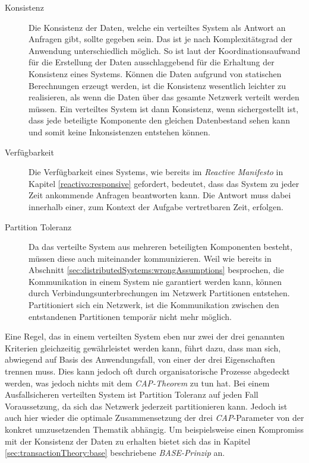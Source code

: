 \begin{description}
\item[Konsistenz]
Die Konsistenz der Daten, welche ein verteiltes System als Antwort an Anfragen gibt, sollte gegeben sein. Das ist je nach Komplexitätsgrad der Anwendung unterschiedlich möglich. So ist laut \cite{gilbertPerspectiveCAPTheorem2012} der Koordinationsaufwand für die Erstellung der Daten ausschlaggebend für die Erhaltung der Konsistenz eines Systems. Können die Daten aufgrund von statischen Berechnungen erzeugt werden, ist die Konsistenz wesentlich leichter zu realisieren, als wenn die Daten über das gesamte Netzwerk verteilt werden müssen. Ein verteiltes System ist dann Konsistenz, wenn sichergestellt ist, dass jede beteiligte Komponente den gleichen Datenbestand sehen kann und somit keine Inkonsistenzen entstehen können.   

\item[Verfügbarkeit]
Die Verfügbarkeit eines Systems, wie bereits im {\textit{Reactive Manifesto}} in Kapitel \ref{reactivo:responsive} gefordert, bedeutet, dass das System zu jeder Zeit ankommende Anfragen beantworten kann. Die Antwort muss dabei innerhalb einer, zum Kontext der Aufgabe vertretbaren Zeit, erfolgen.

\item[Partition Toleranz]
Da das verteilte System aus mehreren beteiligten Komponenten besteht, müssen diese auch miteinander kommunizieren. Weil wie bereits in Abschnitt \ref{sec:distributedSystems:wrongAssumptions} besprochen, die Kommunikation in einem System nie garantiert werden kann, können durch Verbindungsunterbrechungen im Netzwerk Partitionen entstehen. Partitioniert sich ein Netzwerk, ist die Kommunikation zwischen den entstandenen Partitionen temporär nicht mehr möglich.
\end{description}
Eine Regel, das in einem verteilten System eben nur zwei der drei genannten Kriterien gleichzeitig gewährleistet werden kann, führt dazu, dass man sich, abwiegend auf Basis des Anwendungsfall, von einer der drei Eigenschaften trennen muss. Dies kann jedoch oft durch organisatorische Prozesse abgedeckt werden, was jedoch nichts mit dem \textit{CAP-Theorem} zu tun hat. Bei einem Ausfallsicheren verteilten System ist Partition Toleranz auf jeden Fall Voraussetzung, da sich das Netzwerk jederzeit partitionieren kann. Jedoch ist auch hier wieder die optimale Zusammensetzung der drei \textit{CAP}-Parameter von der konkret umzusetzenden Thematik abhängig. Um beispielsweise einen Kompromiss mit der Konsistenz der Daten zu erhalten bietet sich das in Kapitel \ref{sec:transactionTheory:base} beschriebene \textit{BASE-Prinzip} an.
